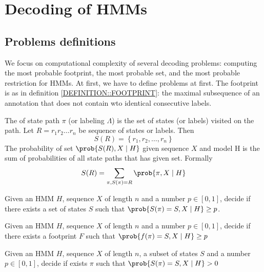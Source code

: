 \chapter{Decoding of HMMs}

\section{Problems definitions}

We focus on computational complexity of several decoding problems: computing the
most probable footprint, the most probable set, and the most probable
restriction for HMMs. At first, we have to define problems at first. The
footprint is as in definition \ref{DEFINITION::FOOTPRINT}: the maximal
subsequence of an annotation that does not contain wto identical consecutive
labels.

\begin{definition}
The  of state path $\pi$ (or labeling $\Lambda$) is the set of
states (or labels) visited on the path. Let $R=r_1r_2\dots r_n$ be sequence of
states or labels. Then 
\begin{equation*}
S(R) = \left\{r_1,r_2,\dots, r_n\right\}
\end{equation*}
The probability of set $\prob{S(R), X\mid H}$ given sequence $X$ and model H is the sum of
probabilities of all state paths that has given set. Formally
\begin{equation*}
S(R) = \sum_{\pi, S(\pi) = R}\prob{\pi, X\mid H}
\end{equation*}
\end{definition}

\begin{definition}
 Given an HMM $H$, sequence $X$ of
length $n$ and a number $p\in [0,1]$, decide if there exists a set of states $S$
such that $\prob{S(\pi) = S, X\mid H} \geq p$.
\end{definition}

\begin{definition}
 Given an HMM $H$, sequence $X$
of length $n$ and a number $p\in [0,1]$, decide if there exists a footprint $F$
such that $\prob{f(\pi) = S, X\mid H}\geq p$
\end{definition}

\begin{definition}
 Given an HMM $H$, sequence
$X$ of length $n$, a subset of states $S$ and a number $p\in [0,1]$, decide if
exists $\pi$ such that $\prob{S(\pi)=S,X\mid H} > 0$
\end{definition}

